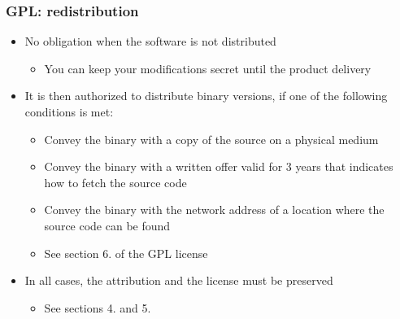 \begin{frame}
  \frametitle{GPL: redistribution}
  \begin{itemize}
  \item No obligation when the software is not distributed
    \begin{itemize}
    \item You can keep your modifications secret until the product
      delivery
    \end{itemize}
  \item It is then authorized to distribute binary versions, if one of
    the following conditions is met:
    \begin{itemize}
    \item Convey the binary with a copy of the source on a physical
      medium
    \item Convey the binary with a written offer valid for 3 years
      that indicates how to fetch the source code
    \item Convey the binary with the network address of a location
      where the source code can be found
    \item See section 6. of the GPL license
    \end{itemize}
  \item In all cases, the attribution and the license must be
    preserved
    \begin{itemize}
    \item See sections 4. and 5.
    \end{itemize}
  \end{itemize}
\end{frame}

